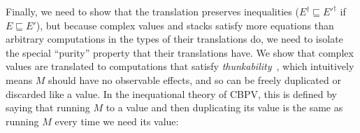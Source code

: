 \documentclass[acmsmall,nonacm]{acmart}
\renewcommand{\u}{\underline}
\newcommand{\cbpv}{CBPV}
\newcommand{\cbpvstar}{CBPV*}
\newcommand{\ltdyn}{\sqsubseteq}
\newcommand{\simp}[1]{{#1}^{\dag}}
\newcommand{\kw}[1]{\texttt{#1}\,\,}
\newcommand{\ret}{\kw{ret}}
\begin{document}
Finally, we need to show that the translation preserves inequalities
($\simp{E} \ltdyn \simp{E'}$ if $E \ltdyn E'$), but because complex
values and stacks satisfy more equations than arbitrary computations in
the types of their translations do, we need to isolate the special
``purity'' property that their translations have.
%
We show that complex values are translated to computations that satisfy
\emph{thunkability}~\cite{munchmaccagnoni14nonassociative}, which
%
intuitively means $M$ should have no observable effects, and so
can be freely duplicated or discarded like a value.
%
In the inequational theory of \cbpv\/, this is defined by saying that
running $M$ to a value and then duplicating its value is the same as
running $M$ every time we need its value:
\end{document}
